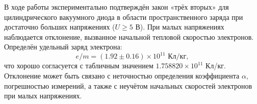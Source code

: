   В ходе работы экспериментально подтверждён закон «трёх вторых» для цилиндрического вакуумного диода в области пространственного заряда при достаточно больших напряжениях ($U \ge 5$ В). При малых напряжениях наблюдается отклонение, вызванное начальной тепловой скоростью электронов. Определён удельный заряд электрона:
  \[
  e/m = (1.92 \pm 0.16) \times 10^{11} \text{ Кл/кг},
  \]
  что хорошо согласуется с табличным значением $1.758820 \times 10^{11}$ Кл/кг. Отклонение может быть связано с неточностью определения коэффициента $\alpha$, погрешностью измерений, а также с неучётом начальных скоростей электронов при малых напряжениях.
  
